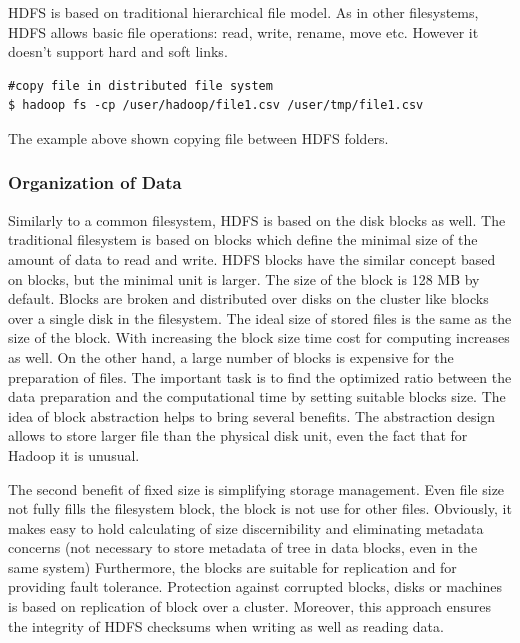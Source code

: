 \documentclass[a4paper,12pt,oneside]{report}
\begin{document}
	HDFS is based on traditional hierarchical file model. As in other filesystems,
	HDFS allows basic file operations: 
	read, write, rename, move etc. However it doesn’t support hard and soft links. 
	
	\begin{footnotesize}
		\begin{lstlisting}[style=mybash]
#copy file in distributed file system
$ hadoop fs -cp /user/hadoop/file1.csv /user/tmp/file1.csv 
		\end{lstlisting}
	\end{footnotesize} 
	The example above shown copying file between HDFS folders. 
	
	
	\subsubsection{Organization of Data}
	Similarly to  a common filesystem, HDFS is based on the disk blocks as well. The
	traditional
	filesystem is based on blocks which define the minimal size of the amount of
	data to read and write.
	HDFS blocks have the similar concept based on blocks, but the minimal unit is
	larger. The size of the block is 128 MB by default. Blocks are broken and
	distributed
	over disks on the cluster like blocks over a single disk in the filesystem. The
	ideal 
	size of stored files is the same as the size of the block. With increasing the
	block 
	size time cost for computing increases as well. On the other hand, a large
	number
	of blocks is expensive for the preparation of files. The important task is to
	find the optimized 
	ratio between the data preparation and the computational time by setting suitable
	blocks size.
	The idea of block abstraction helps to bring several benefits.
	The abstraction design allows to store larger file than the physical disk
	unit, 
	even the fact that for Hadoop it is unusual.
	
	The second benefit of fixed size is simplifying storage management. Even file
	size not fully 		
	fills the filesystem block, the block is not use for other files. 
	Obviously, it makes easy 
	to hold calculating of size discernibility and eliminating metadata concerns
	(not necessary 
	to store metadata of tree in data blocks, even in the same system)
	Furthermore, the blocks are suitable for replication and for providing fault
	tolerance. Protection
	against corrupted blocks, disks or machines is based on replication of block
	over a cluster. 
	Moreover, this approach ensures the integrity of HDFS checksums when writing as
	well as reading data.
	
\end{document}
